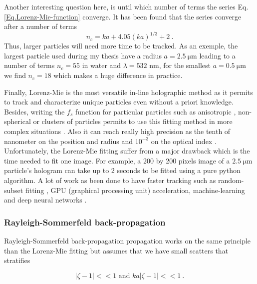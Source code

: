  Another interesting question here, is until which number of terms the series Eq.\ref{Eq.Lorenz-Mie-function} converge. It has been found \cite{lentz_generating_1976} that the series converge after a number of terms
\begin{equation}
	n_c = k a + 4.05 (k a)^{1/3} + 2 ~.
\end{equation}
Thus, larger particles will need more time to be tracked. As an exemple, the largest particle used during my thesis have a radius $a = 2.5 ~ \mathrm{\mu m}$ leading to a number of terms $ n_c = 55$ in water and $\lambda = 532$ nm, for the smallest $a = 0.5 ~ \mathrm{\mu m}$ we find $n_c = 18$ which makes a huge difference in practice.

Finally, Lorenz-Mie is the most versatile in-line holographic method as it permits to track and characterize unique particles even without a priori knowledge. Besides, writing the $f_s$ function for particular particles such as anisotropic \cite{fung_holographic_2013}, non-spherical \cite{wang_using_2014} or clusters \cite{fung_holographic_2013, perry_real-space_2013} of particles permits to use this fitting method in more complex situations . Also it can reach really high precision as the tenth of nanometer on the position and radius and $10^{-3}$ on the optical index \cite{lee_characterizing_2007}. Unfortunately, the Lorenz-Mie fitting suffer from a major drawback which is the time needed to fit one image. For example, a 200 by 200 pixels image of a $2.5 ~ \mathrm{\mu m}$ particle's hologram can take up to 2 seconds to be fitted using a pure python algorithm. A lot of work as been done to have faster tracking such as random-subset fitting \cite{dimiduk_random-subset_2014}, GPU (graphical processing unit) acceleration, machine-learning \cite{yevick_machine-learning_2014, hannel_machine-learning_2018} and deep neural networks \cite{altman_catch_2020}.

\subsubsection{ Rayleigh-Sommerfeld back-propagation}

Rayleigh-Sommerfeld back-propagation \cite{wilson_3d_2012} propagation works on the same principle than the Lorenz-Mie fitting but assumes that we have small scatters that stratifies

\begin{equation}
	|\zeta - 1| << 1 \text{ and } ka|\zeta - 1| << 1 ~.
\end{equation}

